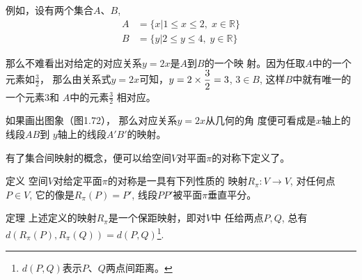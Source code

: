例如，设有两个集合$A$、$B$, 
\[\begin{split}
  A&=\{x|1\le x\le 2,\; x\in\mathbb{R}\}\\
B&=\{y|2\le y\le 4,\; y\in\mathbb{R}\}
\end{split}\]

那么不难看出对给定的对应关系$y=2x$是$A$到$B$的一个映
射。因为任取$A$中的一个元素如$\frac{3}{2}$，
那么由关系式$y=2x$可知，$y=2\times\dfrac{3}{2}=3$, $3\in B$, 这样$B$中就有唯一的一个元素3和
$A$中的元素$\frac{3}{2}$
相对应。

\begin{figure}[htp]
  \centering
{}
  \caption{}
\end{figure}

如果画出图象（图1.72），
那么对应关系$y=2x$从几何的角
度便可看成是$x$轴上的线段$AB$到
$y$轴上的线段$A'B'$的映射。

有了集合间映射的概念，便可以给空间$V$对平面$\pi$的对称下定义了。

\begin{blk}
  {定义} 空间$V$对给定平面$\pi$的对称是一具有下列性质的
映射$R_{\pi}:V\to V$, 对任何点$P\in V$, 它的像是$R_{\pi}(P)=P'$, 
线段$PP'$被平面$\pi$垂直平分。
\end{blk}

\begin{blk}
  {定理} 上述定义的映射$R_{\pi}$是一个保距映射，即对$V$中
任给两点$P,Q$, 总有$d(R_{\pi}(P),R_{\pi}(Q))=d(P,Q)$\footnote{$d(P,Q)$表示$P$、$Q$两点间距离。}.
\end{blk}


